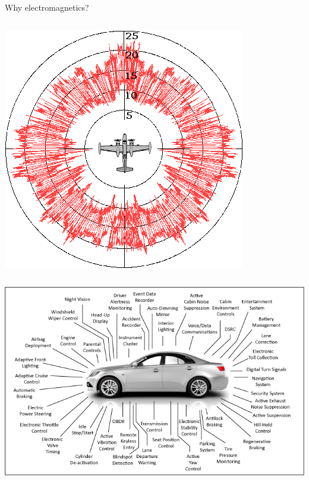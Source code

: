 \documentclass[aspectratio=169, usenames, dvipsnames]{beamer}
\begin{document}
\begin{frame}{Why electromagnetics?}
\begin{columns}
      \centering
      \includegraphics[width=\textwidth]{figures/Sigma_invader_RCS}
  \end{columns}
\end{frame}

\begin{frame}
  \includegraphics[width=\textwidth]{figures/auto-systems04}
\end{frame}
\end{document}
